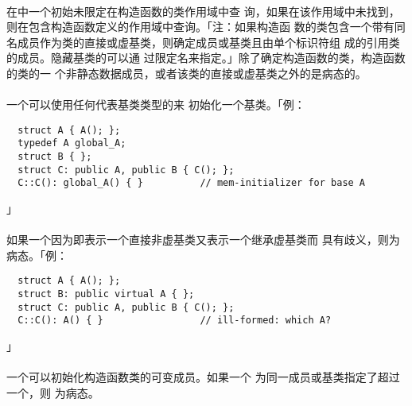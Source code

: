 \paragraph{}
在中一个初始未限定在构造函数的类作用域中查
询，如果在该作用域中未找到，则在包含构造函数定义的作用域中查询。「注：如果构造函
数的类包含一个带有同名成员作为类的直接或虚基类，则确定成员或基类且由单个标识符组
成的引用类的成员。隐藏基类的可以通
过限定名来指定。」除了确定构造函数的类，构造函数的类的一
个非静态数据成员，或者该类的直接或虚基类之外的是病态的。

\paragraph{}
一个可以使用任何代表基类类型的来
初始化一个基类。「例：
\begin{lstlisting}
  struct A { A(); };
  typedef A global_A;
  struct B { };
  struct C: public A, public B { C(); };
  C::C(): global_A() { }          // mem-initializer for base A
\end{lstlisting}」

\paragraph{}
如果一个因为即表示一个直接非虚基类又表示一个继承虚基类而
具有歧义，则为病态。「例：
\begin{lstlisting}
  struct A { A(); };
  struct B: public virtual A { };
  struct C: public A, public B { C(); };
  C::C(): A() { }                 // ill-formed: which A?
\end{lstlisting}」

\paragraph{}
一个可以初始化构造函数类的可变成员。如果一个
为同一成员或基类指定了超过一个，则
为病态。

